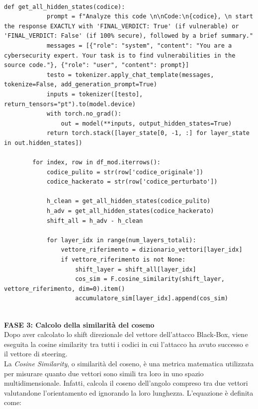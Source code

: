 \begin{verbatim}
    
def get_all_hidden_states(codice):
            prompt = f"Analyze this code \n\nCode:\n{codice}, \n start the response EXACTLY with 'FINAL_VERDICT: True' (if vulnerable) or 'FINAL_VERDICT: False' (if 100% secure), followed by a brief summary."
            messages = [{"role": "system", "content": "You are a cybersecurity expert. Your task is to find vulnerabilities in the source code."}, {"role": "user", "content": prompt}]
            testo = tokenizer.apply_chat_template(messages, tokenize=False, add_generation_prompt=True)
            inputs = tokenizer([testo], return_tensors="pt").to(model.device)
            with torch.no_grad():
                out = model(**inputs, output_hidden_states=True)
            return torch.stack([layer_state[0, -1, :] for layer_state in out.hidden_states])

        for index, row in df_mod.iterrows():
            codice_pulito = str(row['codice_originale']) 
            codice_hackerato = str(row['codice_perturbato'])

            h_clean = get_all_hidden_states(codice_pulito)
            h_adv = get_all_hidden_states(codice_hackerato)
            shift_all = h_adv - h_clean

            for layer_idx in range(num_layers_totali):
                vettore_riferimento = dizionario_vettori[layer_idx]
                if vettore_riferimento is not None:
                    shift_layer = shift_all[layer_idx]
                    cos_sim = F.cosine_similarity(shift_layer, vettore_riferimento, dim=0).item()
                    accumulatore_sim[layer_idx].append(cos_sim)
        
\end{verbatim}


\textbf{FASE 3: Calcolo della similarità del coseno}\\
Dopo aver calcolato lo shift direzionale del vettore dell'attacco Black-Box, viene eseguita la cosine similarity tra tutti i codici in cui l'attacco ha avuto successo e il vettore di steering. \\
La \textit{Cosine Similarity}, o similarità del coseno, è una metrica matematica utilizzata per misurare quanto due vettori sono simili tra loro in uno spazio multidimensionale. Infatti, calcola il coseno dell'angolo compreso tra due vettori valutandone l'orientamento ed ignorando la loro lunghezza.
L'equazione è definita come:

